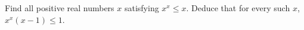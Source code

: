 Find all positive real numbers $x$ satisfying $x^x\le x$. Deduce that for every such $x$, $x^x(x-1)\le1$.
